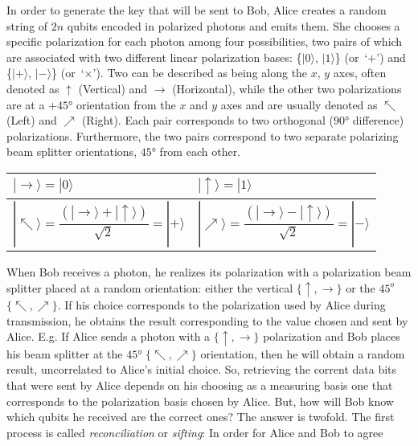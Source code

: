 In order to generate the key that will be sent to Bob, Alice creates a random string of $2n$
qubits encoded in polarized photons and emits them. She chooses a specific polarization for
each photon among four possibilities, two pairs of which are associated with two
different linear polarization bases: \{$|0\rangle$, $|1\rangle$\} (or\ `$\bm{+}$') and \{$|+\rangle$, $|-\rangle$\} 
(or\ `$\bm{\times}$').
Two can be described as being along the $x$, $y$ axes, often denoted as $\bm{\uparrow}$ (Vertical)
and $\bm{\rightarrow}$ (Horizontal), while the other two polarizations are at a $+\ang{45}$ orientation 
from the $x$ and $y$ axes and are usually denoted as $\bm{\nwarrow}$ (Left) and $\bm{\nearrow}$ (Right).
Each pair corresponds to two orthogonal ($\ang{90}$ difference) polarizations. Furthermore, the two pairs
correspond to two separate polarizing beam splitter orientations, $\ang{45}$ from each other.
\begin{center}
    \begin{tabular}{|p{4.7cm}|p{4.7cm}|}
    \hline
        \hfil$|{\bm{\rightarrow}}\rangle = |0\rangle$ & 
        \hfil$|{\bm{\uparrow}}\rangle = |1\rangle$ \\
    \hline
         $|{\bm{\nwarrow}}\rangle = \dfrac{(|{\bm{\rightarrow}}\rangle + |{\bm{\uparrow}}\rangle)}{\sqrt{2}} = |+\rangle$ &
         $|{\bm{\nearrow}}\rangle = \dfrac{(|{\bm{\rightarrow}}\rangle - |{\bm{\uparrow}}\rangle)}{\sqrt{2}} = |-\rangle$ \\
    \hline
  \end{tabular}
\end{center}
When Bob receives a photon, he realizes its polarization with a polarization beam splitter
placed at a random orientation: either the vertical $\{\bm{\uparrow} , \bm{\rightarrow}\}$ or
the $45^o$ $\{\bm{\nwarrow} , \bm{\nearrow}\}$.
If his choice corresponds to the polarization used by Alice during transmission, he obtains the result
corresponding to the value chosen and sent by Alice. 
E.g. If Alice sends a photon with a $\{\bm{\uparrow} ,\bm{\rightarrow}\}$
polarization and Bob places his beam splitter at the $\ang{45}$ $\{\bm{\nwarrow} , \bm{\nearrow}\}$ orientation, then he will
obtain a random result, uncorrelated to Alice's initial choice.
So, retrieving the corrent data bits that were sent by Alice depends 
on his choosing as a measuring basis one that corresponds to the polarization basis chosen by Alice.
But, how will Bob know which qubits he received are the correct ones? The answer is twofold.
The first process is called {\it reconciliation} or {\it sifting}: In order for Alice and Bob to agree
